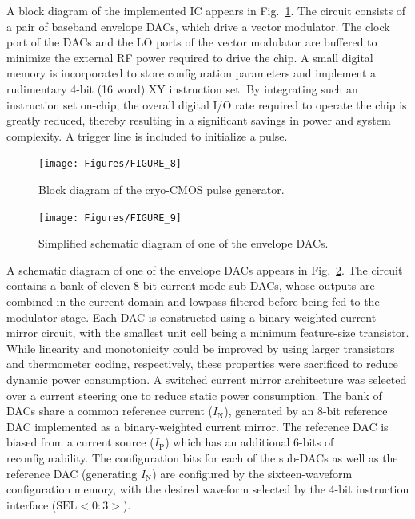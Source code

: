 \documentclass[journal]{IEEEtran}
\newcommand{\CR}[1]{{\color{black}#1}}
\begin{document}
A block diagram of the implemented IC appears in Fig.~\ref{chipbd}. The circuit consists of a pair of baseband envelope DACs, which drive a vector modulator. The clock port of the DACs and the LO ports of the vector modulator are buffered to minimize the external RF power required to drive the chip. A small digital memory is incorporated to store configuration parameters and implement a rudimentary 4-bit (\CR{16 word}) XY instruction set. By integrating such an instruction set on-chip, the overall digital I/O rate required to operate the chip is greatly reduced, thereby resulting in a significant savings in power and system complexity. A trigger line is included to initialize a pulse.
\begin{figure}[bt!]
\texttt{[image: Figures/FIGURE\_8]}
\caption{Block diagram of the cryo-CMOS pulse generator.}\label{chipbd}
\end{figure}
\begin{figure}
\texttt{[image: Figures/FIGURE\_9]}
\caption{Simplified schematic diagram of one of the envelope DACs.}
\label{EnvD}
\end{figure}

A schematic diagram of one of the envelope DACs appears in Fig.~\ref{EnvD}. The circuit contains a bank of eleven 8-bit current-mode sub-DACs, whose outputs are combined in the current domain and lowpass filtered before being fed to the modulator stage. Each DAC is constructed using a binary-weighted current mirror circuit, with the smallest unit cell being a minimum feature-size transistor. While linearity and monotonicity could be improved by using larger transistors and thermometer coding, respectively, these properties were sacrificed to reduce dynamic power consumption. \CR{A switched current mirror architecture was selected over a current steering one to reduce static power consumption.} The bank of DACs share a common reference current ($I_\text{N}$), \CR{generated by an 8-bit reference DAC implemented as a binary-weighted current mirror}. \CR{The reference DAC is} biased from a current source ($I_\text{P}$) which has an additional 6-bits of reconfigurability. The configuration bits for each of the sub-DACs as well as \CR{the reference DAC (generating} $I_\text{N}$) are configured by the sixteen-waveform configuration memory, with the desired waveform  selected by the 4-bit instruction interface ($\mathrm{SEL<0:3>}$). %
\end{document}
